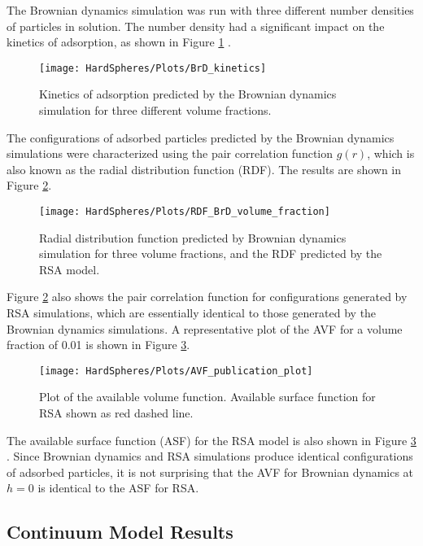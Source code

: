 The Brownian dynamics simulation was run with three different number
densities of particles in solution. The number density had a significant
impact on the kinetics of adsorption, as shown in Figure \ref{fig:BrD Adsorption Kinetics}
.%
\begin{figure}
\texttt{[image: HardSpheres/Plots/BrD\_kinetics]}\caption{\label{fig:BrD Adsorption Kinetics}Kinetics of adsorption predicted
by the Brownian dynamics simulation for three different volume fractions.}


%
\end{figure}
 The configurations of adsorbed particles predicted by the Brownian
dynamics simulations were characterized using the pair correlation
function $g\left(r\right)$, which is also known as the radial distribution
function (RDF). The results are shown in Figure \ref{fig:Brownian Dynamics RDF}.
%
\begin{figure}
\texttt{[image: HardSpheres/Plots/RDF\_BrD\_volume\_fraction]}\caption{\label{fig:Brownian Dynamics RDF}Radial distribution function predicted
by Brownian dynamics simulation for three volume fractions, and the
RDF predicted by the RSA model.}
%
\end{figure}
 Figure \ref{fig:Brownian Dynamics RDF} also shows the pair correlation
function for configurations generated by RSA simulations, which are
essentially identical to those generated by the Brownian dynamics
simulations. A representative plot of the AVF for a volume fraction
of 0.01 is shown in Figure \ref{fig:Available Volume Function}.%
\begin{figure}[H]
\texttt{[image: HardSpheres/Plots/AVF\_publication\_plot]}

\caption{\label{fig:Available Volume Function}Plot of the available volume
function. Available surface function for RSA shown as red dashed line.}
%
\end{figure}
 The available surface function (ASF) for the RSA model is also shown
in Figure \ref{fig:Available Volume Function} \cite{Schaaf1989}.
Since Brownian dynamics and RSA simulations produce identical configurations
of adsorbed particles, it is not surprising that the AVF for Brownian
dynamics at $h=0$ is identical to the ASF for RSA. 


\subsection{Continuum Model Results}

